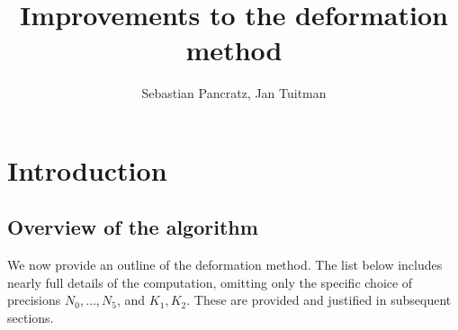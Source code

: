 \documentclass[a4paper,11pt]{article}
\author{Sebastian Pancratz, Jan Tuitman}
\title{Improvements to the deformation method}
\numberwithin{equation}{section}
\theoremstyle{definition}
\begin{document}
\maketitle

\tableofcontents


\section{Introduction}
\label{sec:Introduction}

\subsection{Overview of the algorithm}

We now provide an outline of the deformation method.  The list below 
includes nearly full details of the computation, omitting only the 
specific choice of precisions $N_0, \dotsc, N_5$, and $K_1, K_2$.  
These are provided and justified in subsequent sections.
\end{document}

